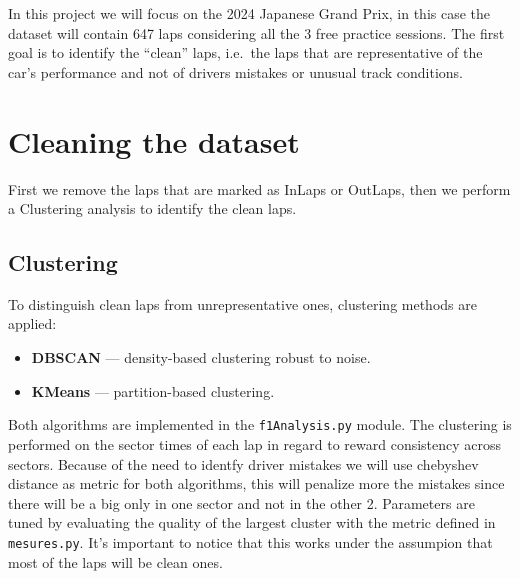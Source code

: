 \documentclass[12pt,a4paper]{article}
\begin{document}
In this project we will focus on the 2024 Japanese Grand Prix, in this case the dataset will contain 647 laps considering all the 3 free practice sessions. The first goal is to identify the ``clean'' laps, i.e.\ the laps that are representative of the car's performance and not of drivers mistakes or unusual track conditions.

\section{Cleaning the dataset}
First we remove the laps that are marked as InLaps or OutLaps, then we perform a Clustering analysis to identify the clean laps.
\subsection{Clustering}
To distinguish clean laps from unrepresentative ones, clustering methods are applied:
\begin{itemize}
    \item \textbf{DBSCAN} — density-based clustering robust to noise.
    \item \textbf{KMeans} — partition-based clustering.
\end{itemize}
Both algorithms are implemented in the \texttt{f1Analysis.py} module. The clustering is performed on the sector times of each lap in regard to reward consistency across sectors. Because of the need to identfy driver mistakes we will use chebyshev distance as metric for both algorithms, this will penalize more the mistakes since there will be a big only in one sector and not in the other 2.
Parameters are tuned by evaluating the quality of the largest cluster with the metric defined in \texttt{mesures.py}. It's important to notice that this works under the assumpion that most of the laps will be clean ones. 
\end{document}
